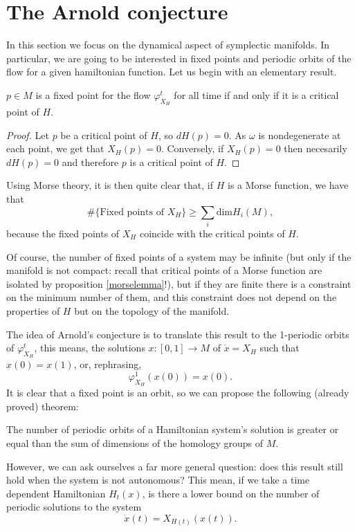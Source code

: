 \section{The Arnold conjecture}

In this section we focus on the dynamical aspect of symplectic manifolds. In particular, we are going to be interested in fixed points and periodic orbits of the flow for a given hamiltonian function. Let us begin with an elementary result.

\begin{prop}
$p \in M$ is a fixed point for the flow $\varphi_{X_H}^t$ for all time if and only if it is a critical point of $H$.
\end{prop}

\begin{proof}
Let $p$ be a critical point of $H$, so $d H(p) = 0$. As $\omega$ is nondegenerate at each point, we get that $X_H(p) = 0$. Conversely, if $X_H(p) = 0$ then necesarily $d H(p) = 0$ and therefore $p$ is a critical point of $H$.
\end{proof}

Using Morse theory, it is then quite clear that, if $H$ is a Morse function, we have that
\[\# \{\text{Fixed points of } X_H\} \geq \sum_i \text{dim}H_i(M) ,\]
because the fixed points of $X_H$ coincide with the critical points of $H$.

Of course, the number of fixed points of a system may be infinite (but only if the manifold is not compact: recall that critical points of a Morse function are isolated by proposition \ref{morselemma}!), but if they are finite there is a constraint on the minimum number of them, and this constraint does not depend on the properties of $H$ but on the topology of the manifold.

The idea of Arnold's conjecture is to translate this result to the 1-periodic orbits of $\varphi_{X_H}^t$, this means, the solutions $x : [0,1] \rightarrow M$ of $\dot{x} = X_H$ such that $x(0) = x(1)$, or, rephrasing,
\[\varphi_{X_H}^1(x(0)) = x(0) .\]
It is clear that a fixed point is an orbit, so we can propose the following (already proved) theorem:

\begin{theo}
The number of periodic orbits of a Hamiltonian system's solution is greater or equal than the sum of dimensions of the homology groups of $M$.
\end{theo}

However, we can ask ourselves a far more general question: does this result still hold when the system is not autonomous? This mean, if we take a time dependent Hamiltonian $H_t(x)$, is there a lower bound on the number of periodic solutions to the system
\[\dot{x}(t) = X_{H(t)}(x(t)) .\]

